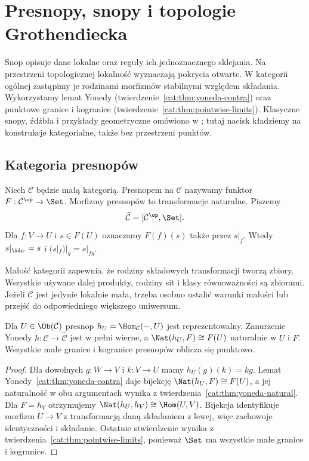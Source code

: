 \section{Presnopy, snopy i topologie Grothendiecka}\label{cat:sec:grothendieck-topologies}

Snop opisuje dane lokalne oraz reguły ich jednoznacznego sklejania. Na przestrzeni topologicznej lokalność wyznaczają pokrycia otwarte. W kategorii ogólnej zastąpimy je rodzinami morfizmów stabilnymi względem składania. Wykorzystamy lemat Yonedy (twierdzenie~\ref{cat:thm:yoneda-contra}) oraz punktowe granice i kogranice (twierdzenie~\ref{cat:thm:pointwise-limits}). Klasyczne snopy, źdźbła i przykłady geometryczne omówiono w ; tutaj nacisk kładziemy na konstrukcje kategorialne, także bez przestrzeni punktów.

\subsection{Kategoria presnopów}

\begin{definicja}\label{cat:def:presheaf}
Niech $\mathcal C$ będzie małą kategorią. Presnopem na $\mathcal C$ nazywamy funktor $F:\mathcal C^{\op}\to\Set$. Morfizmy presnopów to transformacje naturalne. Piszemy
\[
\widehat{\mathcal C}=[\mathcal C^{\op},\Set].
\]
Dla $f:V\to U$ i $s\in F(U)$ oznaczamy $F(f)(s)$ także przez $s|_f$. Wtedy $s|_{\id_U}=s$ i $(s|_f)|_g=s|_{fg}$.
\end{definicja}

Małość kategorii zapewnia, że rodziny składowych transformacji tworzą zbiory. Wszystkie używane dalej produkty, rodziny sit i klasy równoważności są zbiorami. Jeżeli $\mathcal C$ jest jedynie lokalnie mała, trzeba osobno ustalić warunki małości lub przejść do odpowiedniego większego uniwersum.

\begin{stwierdzenie}\label{cat:prop:presheaf-representables}
Dla $U\in\Ob(\mathcal C)$ presnop $h_U=\Hom_{\mathcal C}(-,U)$ jest reprezentowalny. Zanurzenie Yonedy $h:\mathcal C\to\widehat{\mathcal C}$ jest w pełni wierne, a $\Nat(h_U,F)\cong F(U)$ naturalnie w $U$ i $F$. Wszystkie małe granice i kogranice presnopów oblicza się punktowo.
\end{stwierdzenie}
\begin{proof}
Dla dowolnych $g:W\to V$ i $k:V\to U$ mamy $h_U(g)(k)=kg$. Lemat Yonedy~\ref{cat:thm:yoneda-contra} daje bijekcję $\Nat(h_U,F)\cong F(U)$, a jej naturalność w obu argumentach wynika z twierdzenia~\ref{cat:thm:yoneda-natural}. Dla $F=h_V$ otrzymujemy $\Nat(h_U,h_V)\cong\Hom(U,V)$. Bijekcja identyfikuje morfizm $U\to V$ z transformacją daną składaniem z lewej, więc zachowuje identyczności i składanie. Ostatnie stwierdzenie wynika z twierdzenia~\ref{cat:thm:pointwise-limits}, ponieważ $\Set$ ma wszystkie małe granice i kogranice.
\end{proof}

